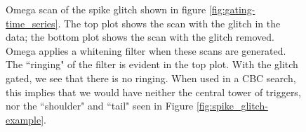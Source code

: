 \begin{figure}[p]
\center
{}
\caption{Omega scan of the spike glitch shown in figure
\ref{fig:gating-time_series}. The top plot shows the scan with the glitch in
the data; the bottom plot shows the scan with the glitch removed. Omega applies
a whitening filter when these scans are generated. The ``ringing" of the filter
is evident in the top plot. With the glitch gated, we see that there is no
ringing. When used in a CBC search, this implies that we would have
neither the central tower of triggers, nor the ``shoulder" and ``tail" seen in
Figure \ref{fig:spike_glitch-example}.}
\label{fig:gating-omega_scans}
\end{figure}

